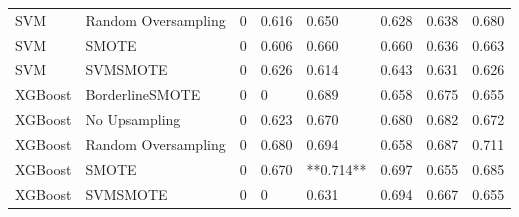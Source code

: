 \begin{tabular}{llllllll}
                         SVM & Random Oversampling &     0 &                     0.616 &                 0.650 &                  0.628 &                                   0.638 &    0.680 \\
                         SVM &               SMOTE &     0 &                     0.606 &                 0.660 &                  0.660 &                                   0.636 &    0.663 \\
                         SVM &            SVMSMOTE &     0 &                     0.626 &                 0.614 &                  0.643 &                                   0.631 &    0.626 \\
                     XGBoost &     BorderlineSMOTE &     0 &                         0 &                 0.689 &                  0.658 &                                   0.675 &    0.655 \\
                     XGBoost &       No Upsampling &     0 &                     0.623 &                 0.670 &                  0.680 &                                   0.682 &    0.672 \\
                     XGBoost & Random Oversampling &     0 &                     0.680 &                 0.694 &                  0.658 &                                   0.687 &    0.711 \\
                     XGBoost &               SMOTE &     0 &                     0.670 &             **0.714** &                  0.697 &                                   0.655 &    0.685 \\
                     XGBoost &            SVMSMOTE &     0 &                         0 &                 0.631 &                  0.694 &                                   0.667 &    0.655 \\
\bottomrule
\end{tabular}
